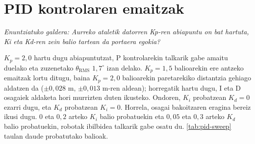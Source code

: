 \clearpage
\section{PID kontrolaren emaitzak}\label{sec:emaitzak-pid}
\noindent\textit{Enuntziatuko galdera: Aurreko ataletik datorren Kp-ren abiapuntu on bat hartuta, Ki eta Kd-ren zein balio tartean da portaera egokia?}\par\vspace{2pt}

$K_p = 2{,}0$ hartu dugu abiapuntutzat, P kontrolarekin talkarik gabe amaitu duelako eta zuzenetako $\theta_{\text{RMS}}$ $1{,}7^\circ$ izan delako. $K_p = 1{,}5$ balioarekin ere antzeko emaitzak lortu ditugu, baina $K_p = 2{,}0$ balioarekin paretarekiko distantzia gehiago aldatzen da ($\pm 0{,}028\text{ m}$, $\pm 0{,}013\text{ m}$-ren aldean); horregatik hartu dugu, I eta D osagaiek aldaketa hori murrizten duten ikusteko. Ondoren, $K_i$ probatzean $K_d = 0$ ezarri dugu, eta $K_d$ probatzean $K_i = 0$. Horrela, osagai bakoitzaren eragina bereiz ikusi dugu. $0$ eta $0{,}2$ arteko $K_i$ balio probatuekin eta $0{,}05$ eta $0{,}3$ arteko $K_d$ balio probatuekin, robotak ibilbidea talkarik gabe osatu du. \ref{tab:pid-sweep} taulan daude probatutako balioak.

